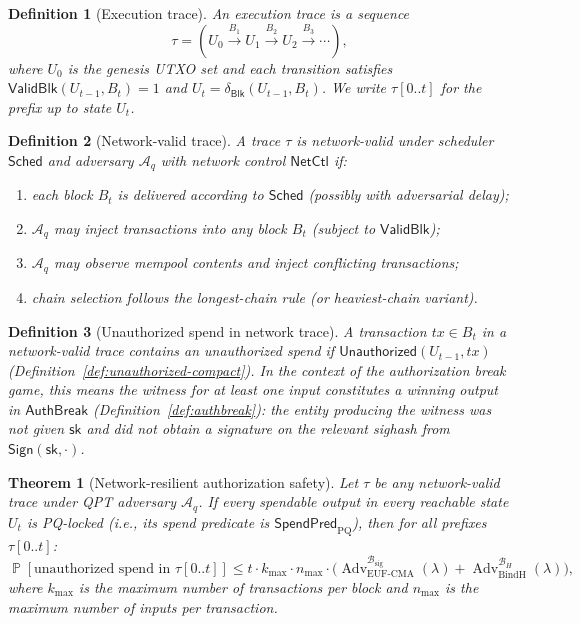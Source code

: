 \documentclass[11pt]{article}
\newtheorem{definition}{Definition}
\newtheorem{theorem}{Theorem}
\newcommand{\Prob}{\operatorname{\mathbb{P}}}
\newcommand{\Adv}{\operatorname{Adv}}
\newcommand{\Aq}{\mathcal{A}_q}
\newcommand{\Blk}{\mathsf{Blk}}
\newcommand{\ValidBlk}{\mathsf{ValidBlk}}
\newcommand{\DeltaBlk}{\delta_{\Blk}}
\newcommand{\Unauthorized}{\mathsf{Unauthorized}}
\newcommand{\SpendPred}{\mathsf{SpendPred}}
\newcommand{\SpendPredPQ}{\SpendPred_{\mathrm{PQ}}}
\begin{document}
\begin{definition}[Execution trace]\label{def:trace}
An execution trace is a sequence
\[
\tau = (U_0 \xrightarrow{B_1} U_1 \xrightarrow{B_2} U_2 \xrightarrow{B_3} \cdots),
\]
where $U_0$ is the genesis UTXO set and each transition satisfies $\ValidBlk(U_{t-1},B_t)=1$ and $U_t=\DeltaBlk(U_{t-1},B_t)$.
We write $\tau[0..t]$ for the prefix up to state $U_t$.
\end{definition}

\begin{definition}[Network-valid trace]\label{def:net-trace}
A trace $\tau$ is \emph{network-valid} under scheduler $\mathsf{Sched}$ and adversary $\Aq$ with network control $\mathsf{NetCtl}$ if:
\begin{enumerate}[leftmargin=2em]
  \item each block $B_t$ is delivered according to $\mathsf{Sched}$ (possibly with adversarial delay);
  \item $\Aq$ may inject transactions into any block $B_t$ (subject to $\ValidBlk$);
  \item $\Aq$ may observe mempool contents and inject conflicting transactions;
  \item chain selection follows the longest-chain rule (or heaviest-chain variant).
\end{enumerate}
\end{definition}

\begin{definition}[Unauthorized spend in network trace]\label{def:unauthorized}
A transaction $tx\in B_t$ in a network-valid trace contains an unauthorized spend if $\Unauthorized(U_{t-1},tx)$ (Definition~\ref{def:unauthorized-compact}).
In the context of the authorization break game, this means the witness for at least one input constitutes a winning output in $\mathsf{AuthBreak}$ (Definition~\ref{def:authbreak}): the entity producing the witness was not given $\mathsf{sk}$ and did not obtain a signature on the relevant sighash from $\mathsf{Sign}(\mathsf{sk},\cdot)$.
\end{definition}

\begin{theorem}[Network-resilient authorization safety]\label{thm:net-safety}
Let $\tau$ be any network-valid trace under QPT adversary $\Aq$.
If every spendable output in every reachable state $U_t$ is PQ-locked (i.e., its spend predicate is $\SpendPredPQ$), then for all prefixes $\tau[0..t]$:
\[
\Prob[\text{unauthorized spend in }\tau[0..t]] \le t\cdot k_{\max}\cdot n_{\max}\cdot\bigl(\Adv_{\mathrm{EUF\mbox{-}CMA}}^{\mathcal{B}_{\mathrm{sig}}}(\lambda) + \Adv_{\mathrm{BindH}}^{\mathcal{B}_H}(\lambda)\bigr),
\]
where $k_{\max}$ is the maximum number of transactions per block and $n_{\max}$ is the maximum number of inputs per transaction.
\end{theorem}
\end{document}
